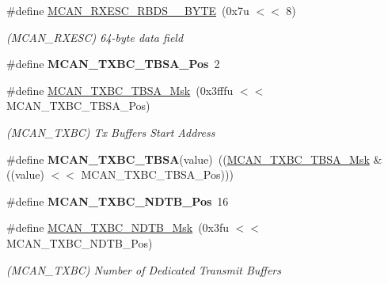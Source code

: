 \begin{DoxyCompactItemize}
\mbox{\label{group__SAMV71__MCAN_ga0510db81a623ed98da4a06b10441bd69}} 
\#define \mbox{\hyperlink{group__SAMV71__MCAN_ga0510db81a623ed98da4a06b10441bd69}{M\+C\+A\+N\+\_\+\+R\+X\+E\+S\+C\+\_\+\+R\+B\+D\+S\+\_\+\_\+\+B\+Y\+TE}}~(0x7u $<$$<$ 8)
\begin{DoxyCompactList}\small\item\em (M\+C\+A\+N\+\_\+\+R\+X\+E\+SC) 64-\/byte data field \end{DoxyCompactList}\item 
\mbox{\label{group__SAMV71__MCAN_gaf76fb62e32deb2b892a57f7002a6b4d0}} 
\#define {\bfseries M\+C\+A\+N\+\_\+\+T\+X\+B\+C\+\_\+\+T\+B\+S\+A\+\_\+\+Pos}~2
\item 
\mbox{\label{group__SAMV71__MCAN_ga585dce7ed951c9171c7d130ff8705797}} 
\#define \mbox{\hyperlink{group__SAMV71__MCAN_ga585dce7ed951c9171c7d130ff8705797}{M\+C\+A\+N\+\_\+\+T\+X\+B\+C\+\_\+\+T\+B\+S\+A\+\_\+\+Msk}}~(0x3fffu $<$$<$ M\+C\+A\+N\+\_\+\+T\+X\+B\+C\+\_\+\+T\+B\+S\+A\+\_\+\+Pos)
\begin{DoxyCompactList}\small\item\em (M\+C\+A\+N\+\_\+\+T\+X\+BC) Tx Buffers Start Address \end{DoxyCompactList}\item 
\mbox{\label{group__SAMV71__MCAN_ga3271e7ee60bdcf311578b0d2c68caebe}} 
\#define {\bfseries M\+C\+A\+N\+\_\+\+T\+X\+B\+C\+\_\+\+T\+B\+SA}(value)~((\mbox{\hyperlink{group__SAMV71__MCAN_ga585dce7ed951c9171c7d130ff8705797}{M\+C\+A\+N\+\_\+\+T\+X\+B\+C\+\_\+\+T\+B\+S\+A\+\_\+\+Msk}} \& ((value) $<$$<$ M\+C\+A\+N\+\_\+\+T\+X\+B\+C\+\_\+\+T\+B\+S\+A\+\_\+\+Pos)))
\item 
\mbox{\label{group__SAMV71__MCAN_ga86d746f75da94cdd863cb226249bf839}} 
\#define {\bfseries M\+C\+A\+N\+\_\+\+T\+X\+B\+C\+\_\+\+N\+D\+T\+B\+\_\+\+Pos}~16
\item 
\mbox{\label{group__SAMV71__MCAN_ga2569c5d6a5ed4392bc1b5d998935c4f5}} 
\#define \mbox{\hyperlink{group__SAMV71__MCAN_ga2569c5d6a5ed4392bc1b5d998935c4f5}{M\+C\+A\+N\+\_\+\+T\+X\+B\+C\+\_\+\+N\+D\+T\+B\+\_\+\+Msk}}~(0x3fu $<$$<$ M\+C\+A\+N\+\_\+\+T\+X\+B\+C\+\_\+\+N\+D\+T\+B\+\_\+\+Pos)
\begin{DoxyCompactList}\small\item\em (M\+C\+A\+N\+\_\+\+T\+X\+BC) Number of Dedicated Transmit Buffers \end{DoxyCompactList}\item 

\end{DoxyCompactItemize}
